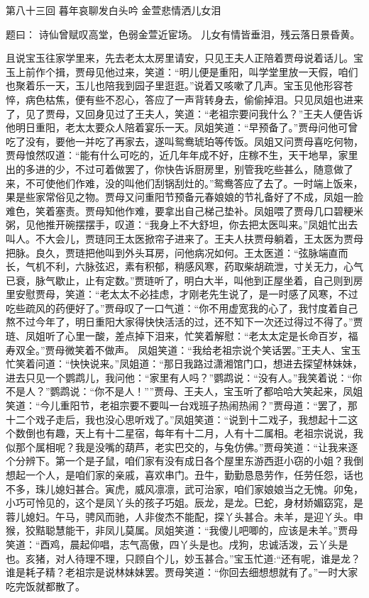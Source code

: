 \documentclass[12pt,oneside]{book}
\begin{document}
第八十三回 暮年哀聊发白头吟 金萱悲情洒儿女泪

题曰：
诗仙曾赋叹高堂，色弱金萱近宦场。
儿女有情皆垂泪，残云落日景昏黄。

且说宝玉往家学里来，先去老太太房里请安，只见王夫人正陪着贾母说着话儿。宝玉上前作个揖，贾母见他过来，笑道：“明儿便是重阳，叫学堂里放一天假，咱们也聚着乐一天，玉儿也陪我到园子里逛逛。”说着又咳嗽了几声。宝玉见他形容苍悴，病色枯焦，便有些不忍心，答应了一声背转身去，偷偷掉泪。只见凤姐也进来了，见了贾母，又回身见过了王夫人，笑道：“老祖宗要问我什么？”王夫人便告诉他明日重阳，老太太要众人陪着宴乐一天。凤姐笑道：“早预备了。”贾母问他可曾吃了没有，要他一并吃了再家去，遂叫鸳鸯琥珀等传饭。凤姐又问贾母喜吃何物，贾母悢然叹道：“能有什么可吃的，近几年年成不好，庄稼不生，天干地旱，家里出的多进的少，不过可着做罢了，你快告诉厨房里，别管我吃些甚么，随意做了来，不可使他们作难，没的叫他们刮锅刮灶的。”鸳鸯答应了去了。一时端上饭来，果是些家常俗见之物。贾母又问重阳节预备元春娘娘的节礼备好了不成，凤姐一脸难色，笑着塞责。贾母知他作难，要拿出自己梯己垫补。凤姐喂了贾母几口碧粳米粥，见他推开碗摆摆手，叹道：“我身上不大舒坦，你去把太医叫来。”凤姐忙出去叫人。不大会儿，贾琏同王太医掀帘子进来了。王夫人扶贾母躺着，王太医为贾母把脉。良久，贾琏把他叫到外头耳房，问他病况如何。王太医道：“弦脉端直而长，气机不利，六脉弦迟，素有积郁，稍感风寒，药取柴胡疏泄，寸关无力，心气已衰，脉气歇止，止有定数。”贾琏听了，明白大半，叫他到正屋坐着，自己则到房里安慰贾母，笑道：“老太太不必挂虑，才刚老先生说了，是一时感了风寒，不过吃些疏风的药便好了。”贾母叹了一口气道：“你不用虚宽我的心了，我忖度着自己熬不过今年了，明日重阳大家得快快活活的过，还不知下一次还过得过不得了。”贾琏、凤姐听了心里一酸，差点掉下泪来，忙笑着解慰：“老太太定是长命百岁，福寿双全。”贾母微笑着不做声。
凤姐笑道：“我给老祖宗说个笑话罢。”王夫人、宝玉忙笑着问道：“快快说来。”凤姐道：“那日我路过潇湘馆门口，想进去探望林妹妹，进去只见一个鹦鹉儿，我问他：“家里有人吗？”鹦鹉说：“没有人。”我笑着说：“你不是人？”鹦鹉说：“你不是人！””贾母、王夫人，宝玉听了都哈哈大笑起来，凤姐笑道：“今儿重阳节，老祖宗要不要叫一台戏班子热闹热闹？”贾母道：“罢了，那十二个戏子走后，我也没心思听戏了。”凤姐笑道：“说到十二戏子，我想起十二这个数倒也有趣，天上有十二星宿，每年有十二月，人有十二属相。老祖宗说说，我似那个属相呢？我是没嘴的葫芦，老实巴交的，与兔仿佛。”贾母笑道：“让我来逐个分辨下。第一个是子鼠，咱们家有没有成日各个屋里东游西逛小窃的小姐？我倒想起一个人，是咱们家的亲戚，喜欢串门。丑牛，勤勤恳恳劳作，任劳任怨，话也不多，珠儿媳妇甚合。寅虎，威风凛凛，武可治家，咱们家娘娘当之无愧。卯兔，小巧可怜见的，这个是凤丫头的孩子巧姐。辰龙，是龙。巳蛇，身材娇媚窈窕，是蓉儿媳妇。午马，骋风而驰，人非俊杰不能配，探丫头甚合。未羊，是迎丫头。申猴，狡黠聪慧能干，非凤儿莫属。凤姐笑道：“我傻儿吧唧的，应该是未羊。”贾母笑道：“酉鸡，晨起仰唱，志气高傲，四丫头是也。戌狗，忠诚活泼，云丫头是也。亥猪，对人待理不理，只顾自个儿，妙玉甚合。”宝玉忙道:“还有呢，谁是龙？谁是耗子精？老祖宗是说林妹妹罢。贾母笑道：“你回去细想想就有了。”一时大家吃完饭就都散了。
\end{document}
